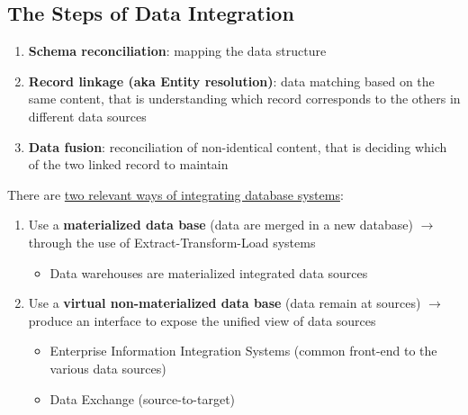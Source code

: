 \documentclass[10pt,a4paper]{article}
\begin{document}
\subsection{The Steps of Data Integration}
\begin{enumerate}
	\item \textbf{Schema reconciliation}: mapping the data structure
	\item \textbf{Record linkage (aka Entity resolution)}: data matching based on the same content, that is understanding which record corresponds to the others in different data sources
	\item \textbf{Data fusion}: reconciliation of non-identical content, that is deciding which of the two linked record to maintain
\end{enumerate}
There are \uline{two relevant ways of integrating database systems}:
\begin{enumerate}
	\item Use a \textbf{materialized data base} (data are merged in a new database) $\rightarrow$ through the use of Extract-Transform-Load systems
	\begin{itemize}
		\item Data warehouses are materialized integrated data sources
	\end{itemize}
	\item Use a \textbf{virtual non-materialized data base} (data remain at sources) $\rightarrow$ produce an interface to expose the unified view of data sources
	\begin{itemize}
		\item Enterprise Information Integration Systems (common front-end to the various data sources)
		\item Data Exchange (source-to-target)
	\end{itemize}
\end{enumerate}
\end{document}
